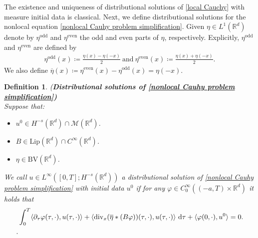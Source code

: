 \documentclass[11pt,reqno]{amsart}
\newtheorem{defn}[thm]{Definition}
\numberwithin{equation}{section}
\def\dd{{\rm d}}
\begin{document}
The existence and uniqueness of distributional solutions of \eqref{local Cauchy} with measure initial data is classical. Next, we define distributional solutions for the nonlocal equation \eqref{nonlocal Cauhy problem simplification}. Given $\eta\in L^{1}(\mathbb{R}^{d})$ denote by $\eta^{\mathrm{odd}}$ and $\eta^{\mathrm{even}}$ the odd and even parts of $\eta$, respectively.  Explicitly, $\eta^{\mathrm{odd}}$ and $\eta^{\mathrm{even}}$ are defined by  
\begin{align*}
\eta^{\mathrm{odd}}(x)\coloneqq\frac{\eta(x)-\eta(-x)}{2}  \ \mbox{and}\ \eta^{\mathrm{even}}(x)\coloneqq\frac{\eta(x)+\eta(-x)}{2}.     
\end{align*}
We also define $\overline{\eta}(x)\coloneqq \eta^{\mathrm{even}}(x)-\eta^{\mathrm{odd}}(x)=\eta(-x)$. 
\begin{defn}\label{Defintion measure valued for nonlocal}\textup{(\textbf{Distributional solutions of \eqref{nonlocal Cauhy problem simplification})}}\\
Suppose that: 
\begin{itemize}
    \item $u^{0}\in H^{-s}(\mathbb{R}^{d})\cap \mathcal{M}(\mathbb{R}^{d})$.
    \item $B\in \mathrm{Lip}(\mathbb{R}^{d})\cap C^{\infty}(\mathbb{R}^{d})$. 
    \item $\eta\in \mathrm{BV}(\mathbb{R}^{d})$.
\end{itemize}
We call $u\in L^{\infty}([0,T];H^{-s}(\mathbb{R}^{d}))$ a distributional solution of \eqref{nonlocal Cauhy problem simplification} with initial data $u^{0}$ if for any $\varphi\in C^{\infty}_{0}((-a,T)\times \mathbb{R}^{d})$  it holds that 
\begin{align}
&\int_{0}^{T}\langle\partial_{\tau}\varphi(\tau,\cdot),u(\tau,\cdot) \rangle+ \langle\mathrm{div}_{x}(\overline{\eta}\ast (B\varphi))(\tau,\cdot),u(\tau,\cdot)\rangle \ \dd \tau
+\langle \varphi(0,\cdot),u^{0}\rangle =0. \notag\\
. \label{weak formulation for nonlocal}      
\end{align}    
\end{defn}
\end{document}
